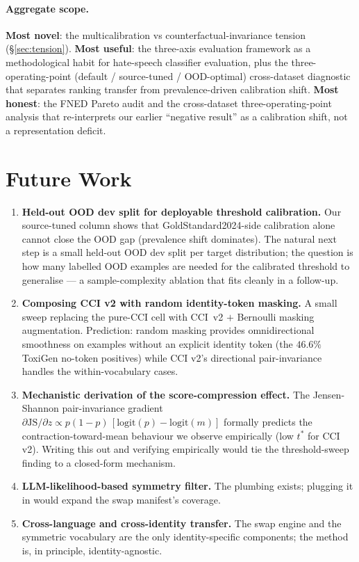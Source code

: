 \documentclass[10pt,a4paper]{article}
\begin{document}
\paragraph{Aggregate scope.} \textbf{Most novel}: the multicalibration vs
counterfactual-invariance tension (\S\ref{sec:tension}). \textbf{Most useful}:
the three-axis evaluation framework as a methodological habit for hate-speech
classifier evaluation, plus the three-operating-point (default / source-tuned
/ OOD-optimal) cross-dataset diagnostic that separates ranking transfer
from prevalence-driven calibration shift. \textbf{Most honest}:
the FNED Pareto audit and the cross-dataset three-operating-point analysis
that re-interprets our earlier ``negative result'' as a calibration shift,
not a representation deficit.

\section{Future Work}

\begin{enumerate}[leftmargin=*,itemsep=2pt]
\item \textbf{Held-out OOD dev split for deployable threshold calibration.}
Our source-tuned column shows that GoldStandard2024-side calibration alone
cannot close the OOD gap (prevalence shift dominates). The natural next step
is a small held-out OOD dev split per target distribution; the question is
how many labelled OOD examples are needed for the calibrated threshold to
generalise --- a sample-complexity ablation that fits cleanly in a follow-up.
\item \textbf{Composing CCI v2 with random identity-token masking.} A small
sweep replacing the pure-CCI cell with CCI~v2 $+$ Bernoulli masking
augmentation. Prediction: random masking provides omnidirectional smoothness
on examples without an explicit identity token (the $46.6\%$ ToxiGen
no-token positives) while CCI v2's directional pair-invariance handles the
within-vocabulary cases.
\item \textbf{Mechanistic derivation of the score-compression effect.}
The Jensen-Shannon pair-invariance gradient
$\partial\mathrm{JS}/\partial z \propto p(1{-}p)\,[\mathrm{logit}(p)-\mathrm{logit}(m)]$
formally predicts the contraction-toward-mean behaviour we observe empirically
(low $t^*$ for CCI v2). Writing this out and verifying empirically would tie
the threshold-sweep finding to a closed-form mechanism.
\item \textbf{LLM-likelihood-based symmetry filter.} The plumbing exists;
plugging it in would expand the swap manifest's coverage.
\item \textbf{Cross-language and cross-identity transfer.} The swap engine
and the symmetric vocabulary are the only identity-specific components; the
method is, in principle, identity-agnostic.
\end{enumerate}
\end{document}
